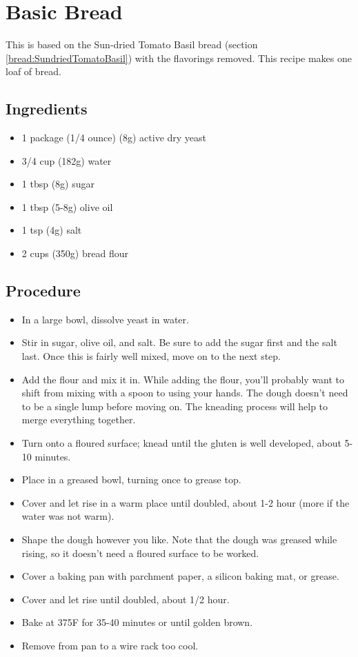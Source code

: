 \documentclass[10pt, openany]{book}
\begin{document}
\section{Basic Bread}
\label{bread:Basic}
This is based on the Sun-dried Tomato Basil bread (section \ref{bread:SundriedTomatoBasil}) with the flavorings removed.  This recipe makes one loaf of bread.

\subsection{Ingredients}
\begin{itemize}
  \item 1 package (1/4 ounce) (8g) active dry yeast
  \item 3/4 cup (182g) water
  \item 1 tbsp (8g) sugar
  \item 1 tbsp (5-8g) olive oil
  \item 1 tsp (4g) salt
  \item 2 cups (350g) bread flour
\end{itemize}
\subsection{Procedure}
\begin{itemize}
  \item In a large bowl, dissolve yeast in water.
  \item Stir in sugar, olive oil, and salt.  Be sure to add the sugar first and the salt last.  Once this is fairly well mixed, move on to the next step.
  \item Add the flour and mix it in.  While adding the flour, you'll probably want to shift from mixing with a spoon to using your hands.  The dough doesn't need to be a single lump before moving on.  The kneading process will help to merge everything together.
  \item Turn onto a floured surface; knead until the gluten is well developed, about 5-10 minutes.
  \item Place in a greased bowl, turning once to grease top.
  \item Cover and let rise in a warm place until doubled, about 1-2 hour (more if the water was not warm).
  \item Shape the dough however you like.  Note that the dough was greased while rising, so it doesn't need a floured surface to be worked.
  \item Cover a baking pan with parchment paper, a silicon baking mat, or grease.
  \item Cover and let rise until doubled, about 1/2 hour.
  \item Bake at 375\degree{}F for 35-40 minutes or until golden brown.
  \item Remove from pan to a wire rack too cool.
\end{itemize}
\end{document}
